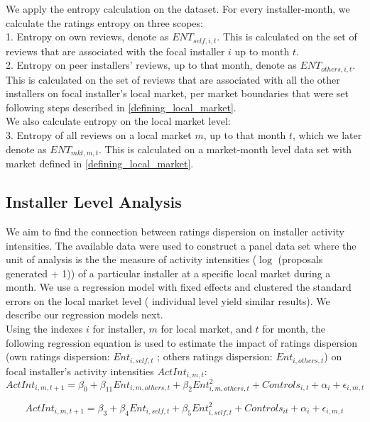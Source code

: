 \documentclass[msom,blindrev]{informs3}
\begin{document}
We apply the entropy calculation on the dataset. For every installer-month, we calculate the ratings entropy on three scopes: \\
1. Entropy on own reviews, denote as $ENT_{self,i,t}$. This is calculated on the set of reviews that are associated with the focal installer $i$ up to month $t$.  \\
2. Entropy on peer installers' reviews, up to that month, denote as $ENT_{others,i,t}$. This is calculated on the set of reviews that are associated with all the other installers on focal installer's local market, per market boundaries that were set following steps described in \ref{defining_local_market}.  \\
We also calculate entropy on the local market level:\\
3. Entropy of all reviews on a local market $m$, up to that month $t$, which we later denote as $ENT_{mkt,m,t}$. This is calculated on a market-month level data set with market defined in \ref{defining_local_market}. \\




\subsection{Installer Level Analysis}
We aim to find the connection between ratings dispersion on installer activity intensities. The available data were used to construct a panel data set where the unit of analysis is the the measure of activity intensities ($\log$ (proposals generated + 1)) of a particular installer at a specific local market during a month. We use a regression model with fixed effects and clustered the standard errors on the local market level ( individual level yield similar results). We describe our regression models next. \\
Using the indexes $i$ for installer, $m$ for local market, and $t$ for month, the following regression equation is used to estimate the impact of ratings dispersion (own ratings dispersion: $Ent_{i,self,t}$ ; others ratings dispersion: $Ent_{i,others,t}$) on focal installer's activity intensities $ActInt_{i,m,t}$:
\begin{equation}
    ActInt_{i,m,t+1}=\beta_{0}+\beta_{11} Ent_{i,m,others,t}+\beta_{2}Ent_{i,m,others,t}^2+
   Controls_{i,t}+\alpha_{i}+\epsilon_{i,m,t}
   \label{model_ind_1}
\end{equation}

\begin{equation}
    ActInt_{i,m,t+1}=\beta_{3}+\beta_{4} Ent_{i,self,t}+\beta_{5}Ent_{i,self,t}^2+
   Controls_{it}+\alpha_{i}+\epsilon_{i,m,t}
   \label{model_ind_2}
\end{equation}
\end{document}
